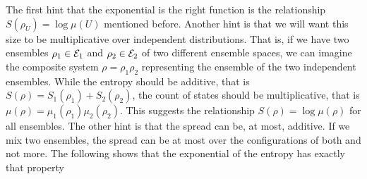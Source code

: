 The first hint that the exponential is the right function is the relationship $S(\rho_U) = \log \mu(U)$ mentioned before. Another hint is that we will want this size to be multiplicative over independent distributions. That is, if we have two ensembles $\rho_1 \in \mathcal{E}_1$ and $\rho_2 \in \mathcal{E}_2$ of two different ensemble spaces, we can imagine the composite system $\rho = \rho_1 \rho_2$ representing the ensemble of the two independent ensembles. While the entropy should be additive, that is $S(\rho) = S_1(\rho_1) + S_2(\rho_2)$, the count of states should be multiplicative, that is $\mu(\rho) = \mu_1(\rho_1) \mu_2(\rho_2)$. This suggests the relationship $S(\rho) = \log \mu (\rho)$ for all ensembles. The other hint is that the spread can be, at most, additive. If we mix two ensembles, the spread can be at most over the configurations of both and not more. The following shows that the exponential of the entropy has exactly that property


